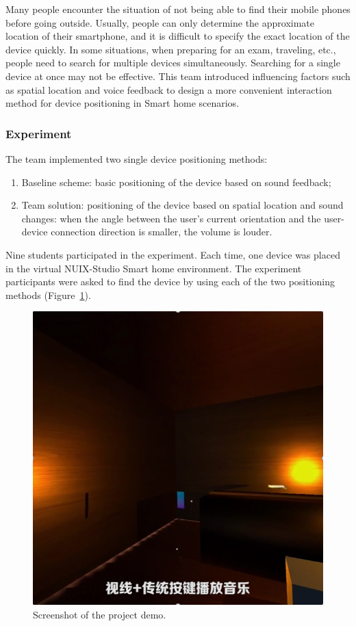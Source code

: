 Many people encounter the situation of not being able to find their mobile phones before going outside. Usually, people can only determine the approximate location of their smartphone, and it is difficult to specify the exact location of the device quickly. 
In some situations, when preparing for an exam, traveling, etc., people need to search for multiple devices simultaneously. Searching for a single device at once may not be effective.
This team introduced influencing factors such as spatial location and voice feedback to design a more convenient interaction method for device positioning in Smart home scenarios. 

\subsubsection{Experiment}
The team implemented two single device positioning methods:
\begin{enumerate}
    \item Baseline scheme: basic positioning of the device based on sound feedback;
    \item Team solution: positioning of the device based on spatial location and sound changes: when the angle between the user's current orientation and the user-device connection direction is smaller, the volume is louder.
\end{enumerate}

Nine students participated in the experiment. Each time, one device was placed in the virtual NUIX-Studio Smart home environment. The experiment participants were asked to find the device by using each of the two positioning methods (Figure~\ref{fig:Project1-1-figure}).

\begin{figure}
  \centering
  \includegraphics[width=0.6\linewidth]{figures/Project_1-1.png}
  \caption{Screenshot of the project demo.}
  \label{fig:Project1-1-figure}
\end{figure}

